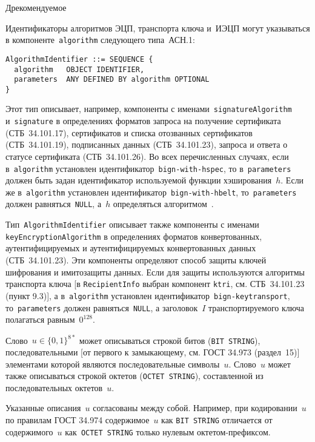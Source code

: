 \begin{appendix}{Д}{рекомендуемое}
\label{ASN.Params}

Идентификаторы алгоритмов ЭЦП, транспорта ключа и~ИЭЦП могут 
указываться в компоненте~\texttt{algorithm} следующего типа~АСН.1:
\begin{verbatim}
AlgorithmIdentifier ::= SEQUENCE {
  algorithm   OBJECT IDENTIFIER,
  parameters  ANY DEFINED BY algorithm OPTIONAL
}
\end{verbatim}

Этот тип описывает, например, 
компоненты с именами~\texttt{signatureAlgorithm} 
и~\texttt{signature} в определениях форматов
запроса на получение сертификата (СТБ~34.101.17),
сертификатов и списка отозванных сертификатов (СТБ~34.101.19), 
подписанных данных (СТБ~34.101.23),
запроса и ответа о статусе сертификата (СТБ~34.101.26).
%
Во всех перечисленных случаях, если в~\texttt{algorithm} установлен
идентификатор~\texttt{bign-with-hspec}, то в~\texttt{parameters} 
должен быть задан идентификатор используемой функции хэширования~$h$. 
%
Если же в~\texttt{algorithm} установлен 
идентификатор~\texttt{bign-with-hbelt},
то~\texttt{parameters} должен равняться~\texttt{NULL},
а~$h$ определяться алгоритмом~.

Тип~\texttt{AlgorithmIdentifier} описывает также компоненты 
с именами \texttt{keyEncryptionAlgorithm} в определениях форматов
конвертованных, аутентифицируемых и аутентифицируемых 
конвертованных данных (СТБ~34.101.23). 
Эти компоненты определяют способ защиты
ключей шифрования и имитозащиты данных. 
%
Если для защиты используются алгоритмы транспорта ключа
[в \texttt{RecipientInfo} выбран компонент \texttt{ktri}, 
см. СТБ~34.101.23 (пункт 9.3)],
а в~\texttt{algorithm} установлен идентификатор~\texttt{bign-keytransport},
то~\texttt{parameters} должен равняться~\texttt{NULL},
а заголовок~$I$ транспортируемого ключа полагаться равным~$0^{128}$.

\label{ASN.Words}

Слово~$u\in\{0,1\}^{8*}$ может описываться строкой битов
(\texttt{BIT STRING}), последовательными 
[от первого к замыкающему, см. ГОСТ 34.973 (раздел~15)]
элементами которой являются последовательные символы~$u$.
%
Слово~$u$ может также описываться строкой октетов 
(\texttt{OCTET STRING}), составленной из последовательных 
октетов~$u$.

Указанные описания~$u$ согласованы между собой. 
Например, при кодировании~$u$ по правилам ГОСТ 34.974 
содержимое~$u$ как \texttt{BIT STRING} отличается
от содержимого~$u$ как~\texttt{OCTET~STRING} 
только нулевым октетом-префиксом.


\end{appendix}
